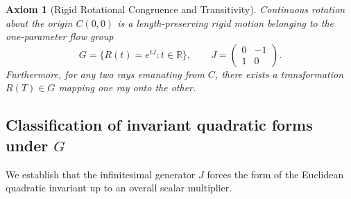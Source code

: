 \documentclass[11pt,a4paper]{article}
\newtheorem{axiom}{Axiom}[section]
\begin{document}
\begin{axiom}[Rigid Rotational Congruence and Transitivity]
Continuous rotation about the origin $C(0,0)$ is a length-preserving rigid motion belonging to the one-parameter flow group
\begin{equation}\label{eq:flow}
G=\{R(t)=e^{tJ}:t\in\mathbb{R}\},\qquad J=\begin{pmatrix}0&-1\\1&0\end{pmatrix}.
\end{equation}
Furthermore, for any two rays emanating from $C$, there exists a transformation $R(T)\in G$ mapping one ray onto the other.
\end{axiom}

\subsection{Classification of invariant quadratic forms under \texorpdfstring{$G$}{G}}
We establish that the infinitesimal generator $J$ forces the form of the Euclidean quadratic invariant up to an overall scalar multiplier.
\end{document}
